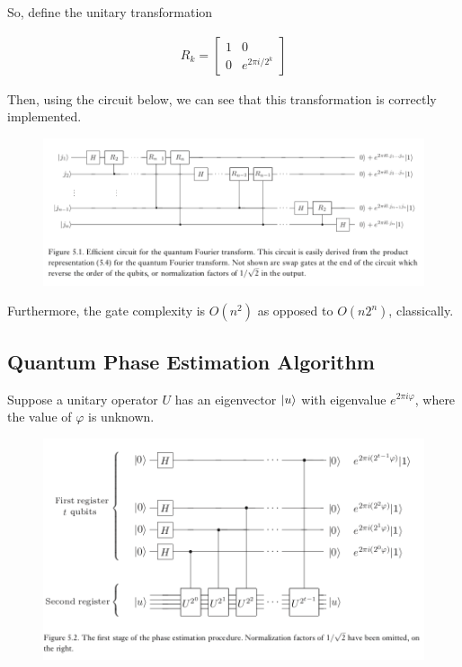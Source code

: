 \documentclass[11pt]{article}
\newcommand\0{\mathbf{0}}
\newcommand\<{\langle}
\renewcommand\>{\rangle}
\renewcommand\phi{\varphi}
\begin{document}
So, define the unitary transformation

\begin{align}
	R_k = \begin{bmatrix}
 1 & 0 \\ 0 & e^{2\pi i / 2^k}	
 \end{bmatrix}
\end{align}

Then, using the circuit below, we can see that this transformation is correctly implemented.

\begin{figure}[H]
\centering
\includegraphics[width=\linewidth]{qfft.png}	
\end{figure}

Furthermore, the gate complexity is $O(n^2)$ as opposed to $O(n2^n)$, classically. 

\subsection{Quantum Phase Estimation Algorithm}\label{phase_estimation}

Suppose a unitary operator $U$ has an eigenvector $\ket{u}$ with eigenvalue $e^{2\pi i \phi}$, where the value of $\phi$ is unknown. 

\begin{figure}[H]
\centering
\includegraphics[width=\linewidth]{phase_estim.png}	
\end{figure}
\end{document}
